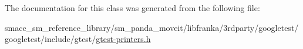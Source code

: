 The documentation for this class was generated from the following file\+:\begin{DoxyCompactItemize}
\item 
smacc\+\_\+sm\+\_\+reference\+\_\+library/sm\+\_\+panda\+\_\+moveit/libfranka/3rdparty/googletest/googletest/include/gtest/\hyperlink{gtest-printers_8h}{gtest-\/printers.\+h}\end{DoxyCompactItemize}
